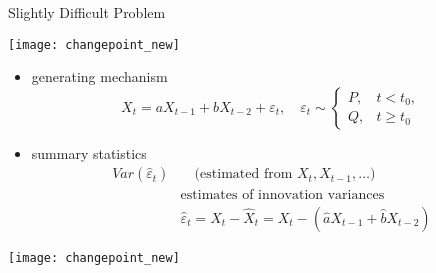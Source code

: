 \documentclass[fleqn,aspectratio=1610]{beamer}
\begin{document}
\begin{frame}[label={sec:orge173104},t]{Slightly Difficult Problem}
\begin{center}
\texttt{[image: changepoint\_new]}
\end{center}
\begin{overprint}
\begin{itemize}
\item generating mechanism
\begin{equation}
  X_{t}=
  aX_{t-1}+bX_{t-2}+\varepsilon_{t},
  \quad\varepsilon_{t}\sim 
  \begin{cases}
    P,&t<t_{0}, \\
    Q,&t\geq t_{0}
  \end{cases}
\end{equation}
\end{itemize}
\begin{itemize}
\item summary statistics
\begin{align}
  Var(\hat{\varepsilon}_{t})
  &\quad
    \text{(estimated from \(X_{t},X_{t-1},\dotsc\))}\\
  &\text{estimates of innovation variances}\\
  &\hat{\varepsilon}_{t}=X_{t}-\hat{X}_{t}=X_{t}-(\hat{a}X_{t-1}+\hat{b}X_{t-2})
\end{align}
\end{itemize}
\begin{center}
\texttt{[image: changepoint\_new]}
\end{center}
\end{overprint}
\end{frame}
\end{document}
